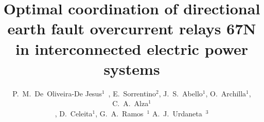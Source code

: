 \documentclass[letterpaper, 10 pt, conference]{IEEEtran}
\begin{document}
\title{Optimal coordination of directional earth fault overcurrent relays  67N in interconnected electric power systems}
%
%
%

\author{ P.~M.~De~Oliveira-De Jesus$^{1}$~, E.~Sorrentino$^{2}$, J.~S.~Abello$^{1}$, O.~Archilla$^{1}$, C.~A.~Alza$^{1}$ \\, D.~Celeita$^{1}$, G.~A.~Ramos~$^{1}$ A.~J.~Urdaneta~$^{3}$
}
\end{document}
